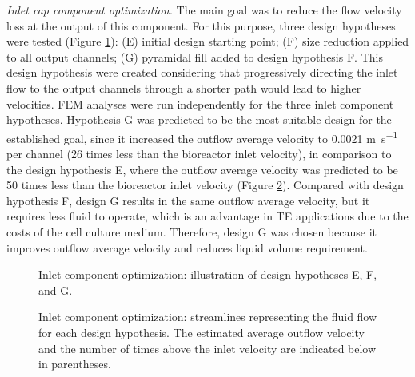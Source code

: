 \textit{Inlet cap component optimization.} The main goal was to reduce the flow velocity loss at the output of this component. For this purpose, three design hypotheses were tested (Figure \ref{figInlet}): (E) initial design starting point; (F) size reduction applied to all output channels; (G) pyramidal fill added to design hypothesis F. This design hypothesis were created considering that progressively directing the inlet flow to the output channels through a shorter path would lead to higher velocities. \ac{FEM} analyses were run independently for the three inlet component hypotheses. Hypothesis G was predicted to be the most suitable design for the established goal, since it increased the outflow average velocity to 0.0021 \si{\meter\per\second} per channel (26 times less than the bioreactor inlet velocity), in comparison to the design hypothesis E, where the outflow average velocity was predicted to be 50 times less than the bioreactor inlet velocity (Figure \ref{figInletResult}). Compared with design hypothesis F, design G results in the same outflow average velocity, but it requires less fluid to operate, which is an advantage in \ac{TE} applications due to the costs of the cell culture medium. Therefore, design G was chosen because it improves outflow average velocity and reduces liquid volume requirement.

\begin{figure}
\caption{Inlet component optimization: illustration of design hypotheses E, F, and G.}
\label{figInlet}
\end{figure}

\begin{figure}
\caption{Inlet component optimization: streamlines representing the fluid flow for each design hypothesis. The estimated
average outflow velocity and the number of times above the inlet velocity are indicated below in parentheses.}
\label{figInletResult}
\end{figure} 


